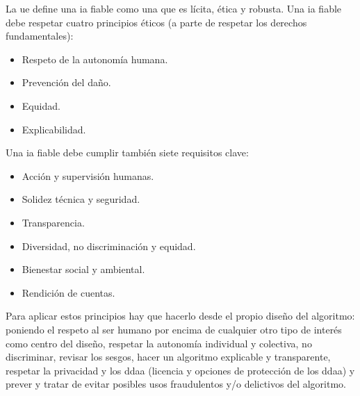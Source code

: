La \gls{ue} define una \gls{ia} fiable como una que es lícita, ética y robusta.
Una \gls{ia} fiable debe respetar cuatro principios éticos (a parte de respetar los derechos fundamentales):
\begin{itemize}
    \item Respeto de la autonomía humana.
    \item Prevención del daño.
    \item Equidad.
    \item Explicabilidad.
\end{itemize}

Una \gls{ia} fiable debe cumplir también siete requisitos clave:
\begin{itemize}
    \item Acción y supervisión humanas.
    \item Solidez técnica y seguridad.
    \item Transparencia.
    \item Diversidad, no discriminación y equidad.
    \item Bienestar social y ambiental.
    \item Rendición de cuentas.
\end{itemize}

Para aplicar estos principios hay que hacerlo desde el propio diseño del algoritmo: poniendo el respeto al ser humano por encima de cualquier otro tipo de interés como centro del diseño, respetar la autonomía individual y colectiva, no discriminar, revisar los sesgos, hacer un algoritmo explicable y transparente, respetar la privacidad y los \gls{ddaa} (licencia y opciones de protección de los \gls{ddaa}) y prever y tratar de evitar posibles usos fraudulentos y/o delictivos del algoritmo.
